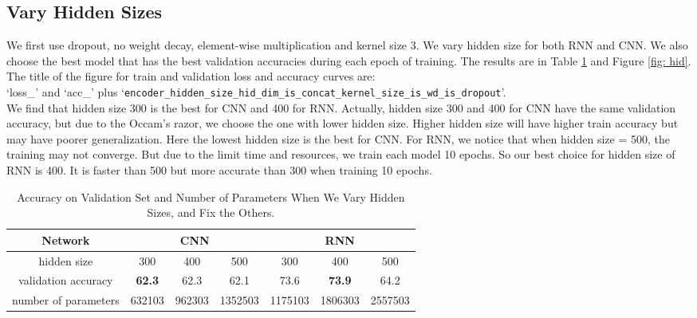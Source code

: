 \documentclass[10pt,a4paper]{article}
\begin{document}
\subsection{Vary Hidden Sizes}
We first use dropout, no weight decay, element-wise multiplication and kernel size 3. We vary hidden size for both RNN and CNN. We also choose the best model that has the best validation accuracies during each epoch of training. The results are in Table \ref{tab: hid} and Figure \ref{fig: hid}. The title of the figure for train and validation loss and accuracy curves are: \\
\noindent`loss\_' and `acc\_' plus `\texttt{encoder\_hidden\_size\_hid\_dim\_is\_concat\_kernel\_size\_is\_wd\_is\_dropout}'. \\
 We find that hidden size 300 is the best for CNN and 400 for RNN. Actually, hidden size 300 and 400 for CNN have the same validation accuracy, but due to the Occam's razor, we choose the one with lower hidden size. Higher hidden size will have higher train accuracy but may have poorer generalization. Here the lowest hidden size is the best for CNN. For RNN, we notice that when hidden size = 500, the training may not converge. But due to the limit time and resources, we train each model 10 epochs. So our best choice for hidden size of RNN is 400. It is faster than 500 but more accurate than 300 when training 10 epochs.
\begin{table}[!ht]
\centering
\begin{tabular}{|c|c|c|c|c|c|c|}
\hline
Network & \multicolumn{3}{|c|}{CNN} & \multicolumn{3}{|c|}{RNN} \\ \hline
hidden size& 300 & 400 & 500& 300 & 400 & 500\\\hline
validation accuracy& \textbf{62.3} & 62.3 & 62.1 & 73.6 & \textbf{73.9} & 64.2\\ \hline
number of parameters & 632103 & 962303 & 1352503 & 1175103 & 1806303 & 2557503 \\ \hline 
\end{tabular}
\caption{\label{tab: hid}Accuracy on Validation Set and Number of Parameters When We Vary Hidden Sizes, and Fix the Others.}
\end{table}
\end{document}
